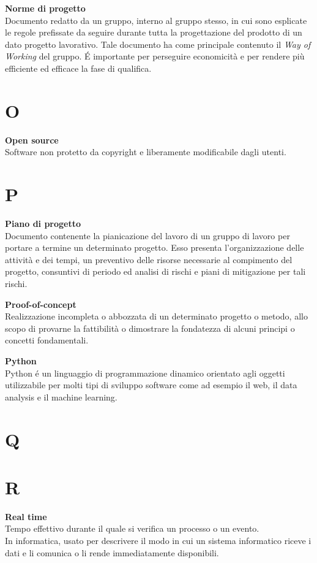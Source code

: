 \documentclass[a4paper, oneside, openany, dvipsnames, table, 12pt]{article}
\begin{document}
\textbf{Norme di progetto} \\
Documento redatto da un gruppo, interno al gruppo stesso, in cui sono esplicate le regole prefissate da seguire durante tutta la progettazione del prodotto di un dato progetto lavorativo. Tale documento ha come principale contenuto il \textit{Way of Working} del gruppo. \'E importante per perseguire economicità e per rendere più efficiente ed efficace la fase di qualifica.

\newpage
\section{O}
\label{par:opens}
\textbf{Open source} \\
Software non protetto da copyright e liberamente modificabile dagli utenti.

\newpage
\section{P}

\textbf{Piano di progetto} \\
Documento contenente la pianicazione del lavoro di un gruppo di lavoro per portare
a termine un determinato progetto. Esso presenta l'organizzazione delle attività e dei
tempi, un preventivo delle risorse necessarie al compimento del progetto, consuntivi
di periodo ed analisi di rischi e piani di mitigazione per tali rischi.

\textbf{Proof-of-concept} \\
Realizzazione incompleta o abbozzata di un determinato progetto o metodo, allo scopo di provarne la fattibilità o dimostrare la fondatezza di alcuni principi o concetti fondamentali.

\textbf{Python} \\
Python \'e un linguaggio di programmazione dinamico orientato agli oggetti utilizzabile per molti tipi di sviluppo software come ad esempio il web, il data analysis e il machine learning.

\newpage
\section{Q}

\newpage
\section{R}
\textbf{Real time} \\
Tempo effettivo durante il quale si verifica un processo o un evento. \\
In informatica, usato per descrivere il modo in cui un sistema informatico riceve i dati e li comunica o li rende immediatamente disponibili.
\end{document}
